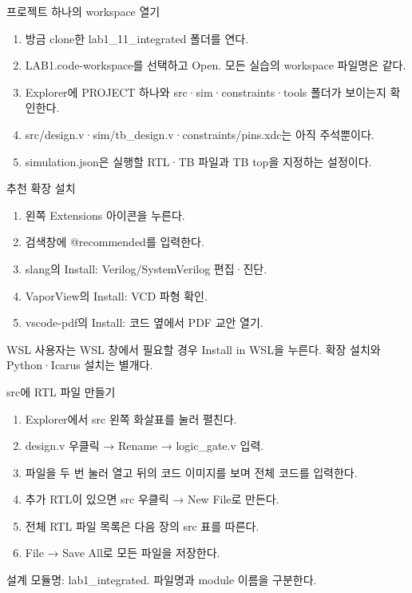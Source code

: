 \begin{frame}{프로젝트 하나의 workspace 열기}\relax
\small
\begin{enumerate}\setlength{\itemsep}{0.22cm}
\item 방금 clone한 lab1\_11\_integrated 폴더를 연다.
\item LAB1.code-workspace를 선택하고 Open. 모든 실습의 workspace 파일명은 같다.
\item Explorer에 PROJECT 하나와 src·sim·constraints·tools 폴더가 보이는지 확인한다.
\item src/design.v·sim/tb\_design.v·constraints/pins.xdc는 아직 주석뿐이다.
\item simulation.json은 실행할 RTL·TB 파일과 TB top을 지정하는 설정이다.
\end{enumerate}

\end{frame}

\begin{frame}{추천 확장 설치}\relax
\small
\begin{enumerate}\setlength{\itemsep}{0.22cm}
\item 왼쪽 Extensions 아이콘을 누른다.
\item 검색창에 @recommended를 입력한다.
\item slang의 Install: Verilog/SystemVerilog 편집·진단.
\item VaporView의 Install: VCD 파형 확인.
\item vscode-pdf의 Install: 코드 옆에서 PDF 교안 열기.
\end{enumerate}
WSL 사용자는 WSL 창에서 필요할 경우 Install in WSL을 누른다. 확장 설치와 Python·Icarus 설치는 별개다.\par
\end{frame}

\begin{frame}{src에 RTL 파일 만들기}\relax
\small
\begin{enumerate}\setlength{\itemsep}{0.22cm}
\item Explorer에서 src 왼쪽 화살표를 눌러 펼친다.
\item design.v 우클릭 → Rename → logic\_gate.v 입력.
\item 파일을 두 번 눌러 열고 뒤의 코드 이미지를 보며 전체 코드를 입력한다.
\item 추가 RTL이 있으면 src 우클릭 → New File로 만든다.
\item 전체 RTL 파일 목록은 다음 장의 src 표를 따른다.
\item File → Save All로 모든 파일을 저장한다.
\end{enumerate}
설계 모듈명: lab1\_integrated. 파일명과 module 이름을 구분한다.\par
\end{frame}

